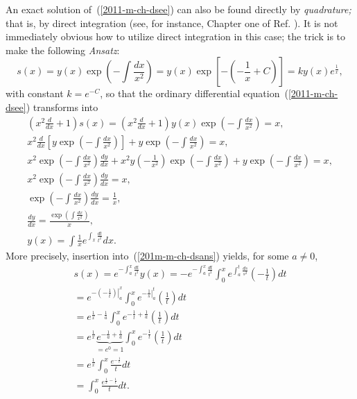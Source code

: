 An exact solution of~(\ref{2011-m-ch-dsee})
can also be found directly by {\em quadrature;}
that is, by direct integration (see, for instance, Chapter one of Ref. \cite{birkhoff-Rota-48}).
It is not immediately obvious how to utilize direct integration in this case; the trick
is to make the following {\it Ansatz}:
\begin{equation}
s(x) = y (x) \exp \left( - \int \frac{ d x}{x^2} \right) = y(x)\exp \left[-\left(-\frac{1}{x}+C\right)\right]= k y(x)e^\frac{1}{x},
\label{201m-m-ch-dsans}
\end{equation}
with constant $k=e^{-C}$,
so that the ordinary differential equation~(\ref{2011-m-ch-dsee}) transforms into
\begin{equation}
\begin{split}
\left(x^2 \frac{d}{dx} +1\right)   s(x) =
\left(x^2 \frac{d}{dx} +1\right) y (x) \exp \left( - \int \frac{ d x}{x^2} \right) = x, \\
x^2 \frac{d  }{dx}\left[ y  \exp \left( - \int \frac{ d x}{x^2} \right)\right] + y  \exp \left( - \int \frac{ d x}{x^2} \right) = x, \\
x^2  \exp \left( - \int \frac{ d x}{x^2} \right)\frac{d y }{d x } + x^2 y \left(- \frac{1}{x^2}\right) \exp \left( - \int \frac{ d x}{x^2} \right) + y   \exp \left( - \int \frac{ d x}{x^2} \right) = x, \\
x^2  \exp \left( - \int \frac{ d x}{x^2} \right)\frac{d y }{d x }  = x, \\
  \exp \left( - \int \frac{ d x}{x^2} \right)\frac{d y }{d x } = \frac{1}{x}, \\
\frac{d y }{d x }  = \frac{ \exp \left( \int \frac{ d x}{x^2} \right)}{x}, \\
 y(x)  = \int \frac{1}{x} e^{ \int_x \frac{ d t}{t^2} } {d x }.
\end{split}
\end{equation}
More precisely, insertion into~(\ref{201m-m-ch-dsans}) yields, for some $a\neq 0$,
\begin{equation}
\begin{split}
s(x) =   e^{ - \int_a^x \frac{ dt}{t^2}}  y(x)=
-  e^{ - \int_a^x \frac{ dt}{t^2}} \int_0^x e^{ \int_a^t \frac{ ds}{s^2}} \left(-\frac{ 1}{t}\right) dt
\\
=
  e^{ - \left. \left(-\frac{1}{t}\right )\right|_a^x} \int_0^x e^{  \left. -\frac{1}{s}\right|_a^t} \left(\frac{ 1}{t}\right) dt
\\
=
  e^{ \frac{1}{x} -  \frac{1}{a} } \int_0^x e^{  -\frac{1}{t} +  \frac{1}{a} } \left(\frac{ 1}{t}\right) dt
\\
=
  e^{ \frac{1}{x}}\underbrace{e^{ -  \frac{1}{a} + \frac{1}{a}}}_{=e^0=1} \int_0^x e^{ -\frac{1}{t} } \left(\frac{ 1}{t}\right) dt
\\
=
e^{   \frac{1}{x}} \int_0^x  \frac{ e^{ - \frac{1}{t}}}{t} dt
\\
=
 \int_0^x  \frac{ e^{ \frac{1}{x} -\frac{1}{t}}}{t} dt.
\end{split}
\label{2011-m-ch-dseeeesola}
\end{equation}
